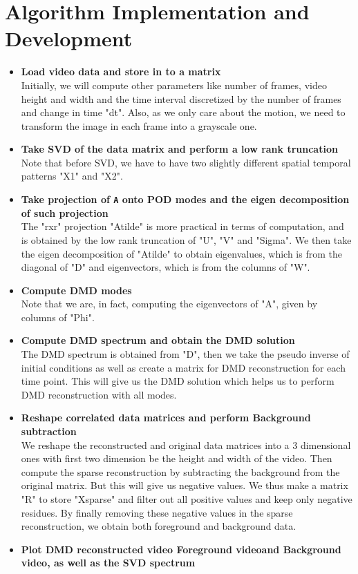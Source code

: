 \documentclass[11pt,a4paper]{article}
\numberwithin{equation}{subsection}
\begin{document}
\section{Algorithm Implementation and Development}
\begin{itemize}
\item[] \textbf{Load video data and store in to a matrix\\}
Initially, we will compute other parameters like number of frames, video height and width and the time interval discretized by the number of frames and change in time "dt". Also, as we only care about the motion, we need to transform the image in each frame into a grayscale one.

\item[] \textbf{Take SVD of the data matrix and perform a low rank truncation\\}
Note that before SVD, we have to have two slightly different spatial temporal patterns "X1" and "X2".

\item[] \textbf{Take projection of \texttt{A} onto POD modes and the eigen decomposition of such projection\\}
The "rxr" projection "Atilde" is more practical in terms of computation, and is obtained by the low rank truncation of "U", "V" and "Sigma". We then take the eigen decomposition of "Atilde" to obtain eigenvalues, which is from the diagonal of "D" and eigenvectors, which is from the columns of "W".

\item[] \textbf{Compute DMD modes\\}
Note that we are, in fact, computing the eigenvectors of "A", given by columns of "Phi".

\item[] \textbf{Compute DMD spectrum and obtain the DMD solution\\}
The DMD spectrum is obtained from "D", then we take the pseudo inverse of initial conditions as well as create a matrix for DMD reconstruction for each time point. This will give us the DMD solution which helps us to perform DMD reconstruction with all modes.

\item[] \textbf{Reshape correlated data matrices and perform Background subtraction}\\
We reshape the reconstructed and original data matrices into a 3 dimensional ones with first two dimension be the height and width of the video. Then compute the sparse reconstruction by subtracting the background from the original matrix. But this will give us negative values. We thus make a matrix "R" to store "Xsparse" and filter out all positive values and keep only negative residues. By finally removing these negative values in the sparse reconstruction, we obtain both foreground and background data.
\item[] \textbf{Plot DMD reconstructed video Foreground videoand Background video, as well as the SVD spectrum}
\end{itemize}
\end{document}

